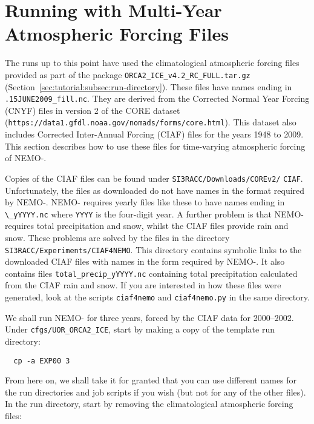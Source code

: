\section{Running with Multi-Year Atmospheric Forcing Files}
\label{sec:forcings}

The runs up to this point have used the climatological atmospheric forcing files provided as part of the package \verb|ORCA2_ICE_v4.2_RC_FULL.tar.gz| (Section~\ref{sec:tutorial:subsec:run-directory}).
These files have names ending in \verb|.15JUNE2009_fill.nc|.
They are derived from the Corrected Normal Year Forcing (CNYF) files in version 2 of the CORE dataset (\verb|https://data1.gfdl.noaa.gov/nomads/forms/core.|\linebreak\verb|html|).
This dataset also includes Corrected Inter-Annual Forcing (CIAF) files for the years 1948 to 2009.
This section describes how to use these files for time-varying atmospheric forcing of NEMO-\SIcu{}.

Copies of the CIAF files can be found under \verb|SI3RACC/Downloads/COREv2/| \verb|CIAF|.
Unfortunately, the files as downloaded do not have names in the format required by NEMO-\SIcu{}.
NEMO-\SIcu{} requires yearly files like these to have names ending in \verb|\_yYYYY.nc| where \verb|YYYY| is the four-digit year.
A further problem is that NEMO-\SIcu{} requires total precipitation and snow, whilst the CIAF files provide rain and snow.
These problems are solved by the files in the directory \verb|SI3RACC/Experiments/CIAF4NEMO|.
This directory contains symbolic links to the downloaded CIAF files with names in the form required by NEMO-\SIcu{}.
It also contains files \verb|total_precip_yYYYY.nc| containing total precipitation calculated from the CIAF rain and snow.
If you are interested in how these files were generated, look at the scripts \verb|ciaf4nemo| and \verb|ciaf4nemo.py| in the same directory.

We shall run NEMO-\SIcu{} for three years, forced by the CIAF data for 2000--2002.
Under \verb|cfgs/UOR_ORCA2_ICE|, start by making a copy of the template run directory:

\begin{verbatim}
  cp -a EXP00 3
\end{verbatim}

\noindent{}From here on, we shall take it for granted that you can use different names for the run directories and job scripts if you wish (but not for any of the other files).
In the run directory, start by removing the climatological atmospheric forcing files:

